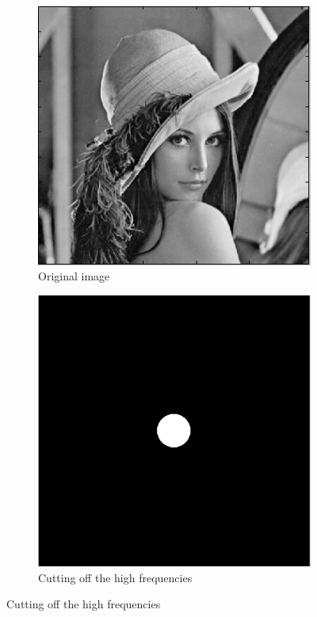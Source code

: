 \documentclass[a4paper, 10pt, conference] {article}
\begin{document}
 \begin{figure}[H]
 	\centering
 	\begin{subfigure}{0.32\textwidth} 
 		\centering						
 		\includegraphics[scale=0.5]{reportImages/exp1_lena.PNG}
 		\caption{Original image}
 	\end{subfigure}
 	\begin{subfigure}{0.32\textwidth}
 		\centering
 		\includegraphics[scale=0.336]{reportImages/mask.PNG}
 		\caption{Cutting off the high frequencies}
 	\end{subfigure}

\end{figure}
\end{document}
